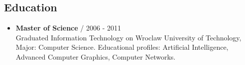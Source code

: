 \documentclass[12pt,a4paper]{article}
\begin{document}
\begin{multicols}{2}
\begin{samepage} \section*{Education }
\begin{itemize}[leftmargin=*]
	\item \textbf{Master of Science} / 2006 - 2011 \\
	Graduated Information Technology on Wroclaw University of Technology, Major: Computer Science. Educational profiles: Artificial Intelligence, Advanced Computer Graphics, Computer Networks.   \\	 
\end{itemize}\end{samepage}



\vfill

\end{multicols}

\vfill
\end{document}
